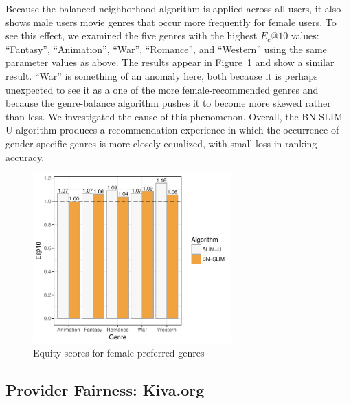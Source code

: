 Because the balanced neighborhood algorithm is applied across all users, it also shows male users movie genres that occur more frequently for female users. To see this effect, we examined the five genres with the highest $E_c@10$ values: ``Fantasy'', ``Animation'', ``War'', ``Romance'', and ``Western'' using the same parameter values as above. The results appear in Figure~\ref{fig:inverse-equity} and show a similar result. ``War'' is something of an anomaly here, both because it is perhaps unexpected to see it as a one of the more female-recommended genres and because the genre-balance algorithm pushes it to become more skewed rather than less. We investigated the cause of this phenomenon. Overall, the BN-SLIM-U algorithm produces a recommendation experience in which the occurrence of gender-specific genres is more closely equalized, with small loss in ranking accuracy.

\begin{figure}[bth]
    \centering
    \includegraphics[width=3in]{imgs/bln/inverse-genres3.pdf}
    \caption{Equity scores for female-preferred genres}
    \label{fig:inverse-equity}
\end{figure}

\subsection{Provider Fairness: Kiva.org}


